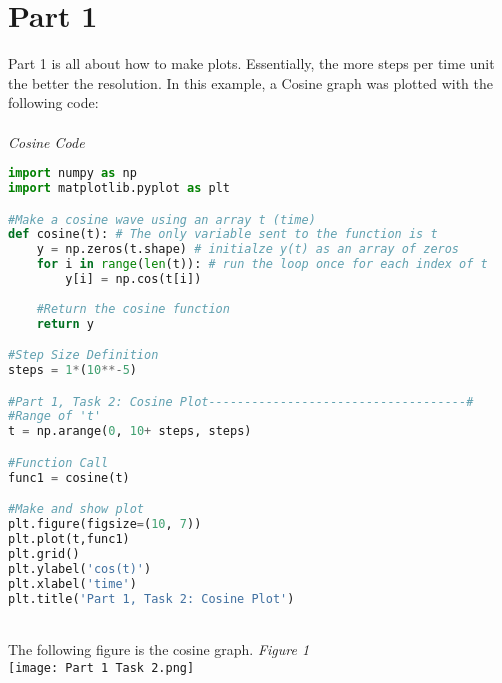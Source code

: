 \documentclass[12pt,a4paper]{article}
\begin{document}
\section{Part 1}\label{sec:intro}
Part 1 is all about how to make plots. Essentially, the more steps per time unit the better the resolution. In this example, a Cosine graph was plotted with the following code:\\
\\
\textit{Cosine Code}
\begin{lstlisting}[language=Python]
import numpy as np
import matplotlib.pyplot as plt

#Make a cosine wave using an array t (time)
def cosine(t): # The only variable sent to the function is t
    y = np.zeros(t.shape) # initialze y(t) as an array of zeros
    for i in range(len(t)): # run the loop once for each index of t
        y[i] = np.cos(t[i])
            
    #Return the cosine function
    return y

#Step Size Definition
steps = 1*(10**-5)

#Part 1, Task 2: Cosine Plot------------------------------------#
#Range of 't'
t = np.arange(0, 10+ steps, steps)

#Function Call
func1 = cosine(t)

#Make and show plot
plt.figure(figsize=(10, 7))
plt.plot(t,func1)
plt.grid()
plt.ylabel('cos(t)')
plt.xlabel('time')
plt.title('Part 1, Task 2: Cosine Plot')

\end{lstlisting}
\\
The following figure is the cosine graph.
\textit{Figure 1}
\\
\texttt{[image: Part 1 Task 2.png]}
\end{document}
